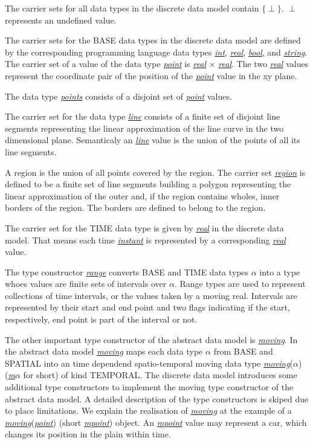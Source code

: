 \documentclass[a4paper]{article}
\newcommand{\dt}[1]{\textsl{\underline{#1}}}
\begin{document}
The carrier sets for all data types in the discrete data model contain
$\{\perp\}$. $\perp$ represents an undefined value.

The carrier sets for the BASE data types in the discrete data model are defined
by the corresponding programming language data types \dt{int}, \dt{real}, \dt{bool},
and \dt{string}. The carrier set of a value of the data type \dt{point} is
\dt{real} $\times$ \dt{real}. The two \dt{real} values represent the
coordinate pair of the position of the \dt{point} value in the xy plane.

The data type \dt{points} consists of a disjoint set of \dt{point} values.

The carrier set for the data type \dt{line}
consists of a finite set of disjoint line segments representing the linear
approximation of the line curve in the two dimensional plane. Semanticaly an
\dt{line} value is the union of the points of all its line segments.

A region
is the union of all points covered by the region. The carrier set \dt{region}
is defined to be a finite set of line segments building a polygon representing
the linear approximation of the outer and, if the region contains wholes, inner
borders of the region. The borders are defined to belong to the region.

The carrier set for the TIME data type is given by \dt{real} in the discrete
data model.
That means each time \dt{instant} is represented by a corresponding \dt{real}
value.

The type constructor \dt{range} converts BASE and TIME data types $\alpha$ into
a type whoes values are finite sets of intervals over $\alpha$. Range types are
used to represent collections of time intervals, or the values taken by a moving
real. Intervals are represented by their start and end point and two flags
indicating if the start, respectively, end point is part of the interval or not.

The other important type constructor of the abstract data model is \dt{moving}.
In the abstract data model \dt{moving} maps each data type $\alpha$ from BASE
and
SPATIAL into an time dependend spatio-temporal moving data type
\dt{moving}($\alpha$)
(\dt{m$\alpha$} for short) of kind TEMPORAL. The discrete data model introduces some
additional type constructors to implement the moving type constructor of the
abstract data model. A detailed description of the type constructors is skiped
due to place limitations. We explain the realisation of \dt{moving} at the example
of a \dt{moving}(\dt{point}) (short \dt{mpoint}) object. An \dt{mpoint} value
may represent a car, which changes its position in the plain within time.
\end{document}
